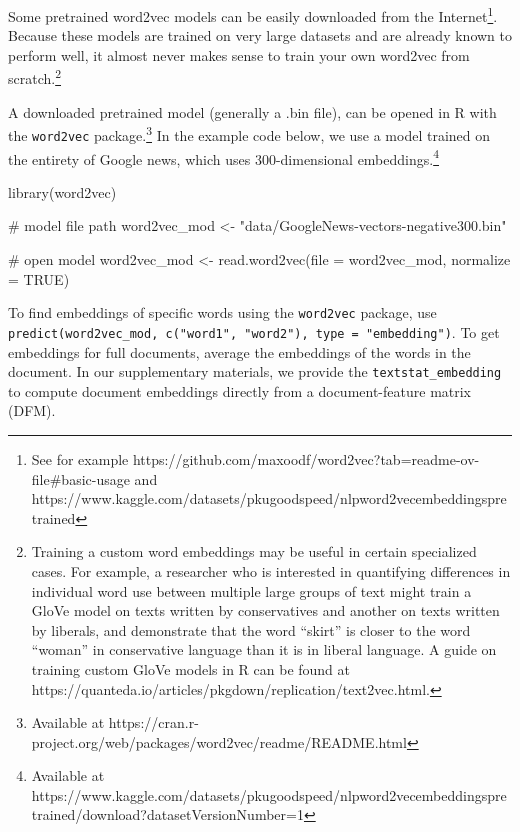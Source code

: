 \documentclass[
  man,
  floatsintext,
  longtable,
  nolmodern,
  notxfonts,
  notimes,
  colorlinks=true,linkcolor=blue,citecolor=blue,urlcolor=blue]{apa7}
\newenvironment{Shaded}{\begin{snugshade}}{\end{snugshade}}
\newcommand{\AttributeTok}[1]{\textcolor[rgb]{0.40,0.45,0.13}{#1}}
\newcommand{\CommentTok}[1]{\textcolor[rgb]{0.37,0.37,0.37}{#1}}
\newcommand{\ConstantTok}[1]{\textcolor[rgb]{0.56,0.35,0.01}{#1}}
\newcommand{\FunctionTok}[1]{\textcolor[rgb]{0.28,0.35,0.67}{#1}}
\newcommand{\NormalTok}[1]{\textcolor[rgb]{0.00,0.23,0.31}{#1}}
\newcommand{\OtherTok}[1]{\textcolor[rgb]{0.00,0.23,0.31}{#1}}
\newcommand{\StringTok}[1]{\textcolor[rgb]{0.13,0.47,0.30}{#1}}
\begin{document}
Some pretrained word2vec models can be easily downloaded from the
Internet\footnote{See for example
  https://github.com/maxoodf/word2vec?tab=readme-ov-file\#basic-usage
  and
  https://www.kaggle.com/datasets/pkugoodspeed/nlpword2vecembeddingspretrained}.
Because these models are trained on very large datasets and are already
known to perform well, it almost never makes sense to train your own
word2vec from scratch.\footnote{Training a custom word embeddings may be
  useful in certain specialized cases. For example, a researcher who is
  interested in quantifying differences in individual word use between
  multiple large groups of text might train a GloVe model on texts
  written by conservatives and another on texts written by liberals, and
  demonstrate that the word ``skirt'' is closer to the word ``woman'' in
  conservative language than it is in liberal language. A guide on
  training custom GloVe models in R can be found at
  https://quanteda.io/articles/pkgdown/replication/text2vec.html.}

A downloaded pretrained model (generally a .bin file), can be opened in
R with the \texttt{word2vec} package.\footnote{Available at
  https://cran.r-project.org/web/packages/word2vec/readme/README.html}
In the example code below, we use a model trained on the entirety of
Google news, which uses 300-dimensional embeddings.\footnote{Available
  at
  https://www.kaggle.com/datasets/pkugoodspeed/nlpword2vecembeddingspretrained/download?datasetVersionNumber=1}

\begin{Shaded}
\begin{Highlighting}[]
\FunctionTok{library}\NormalTok{(word2vec)}

\CommentTok{\# model file path}
\NormalTok{word2vec\_mod }\OtherTok{\textless{}{-}} \StringTok{"data/GoogleNews{-}vectors{-}negative300.bin"}

\CommentTok{\# open model}
\NormalTok{word2vec\_mod }\OtherTok{\textless{}{-}} \FunctionTok{read.word2vec}\NormalTok{(}\AttributeTok{file =}\NormalTok{ word2vec\_mod, }\AttributeTok{normalize =} \ConstantTok{TRUE}\NormalTok{)}
\end{Highlighting}
\end{Shaded}

To find embeddings of specific words using the \texttt{word2vec}
package, use
\texttt{predict(word2vec\_mod,\ c("word1",\ "word2"),\ type\ =\ "embedding")}.
To get embeddings for full documents, average the embeddings of the
words in the document. In our supplementary materials, we provide the
\texttt{textstat\_embedding} to compute document embeddings directly
from a document-feature matrix (DFM).
\end{document}
